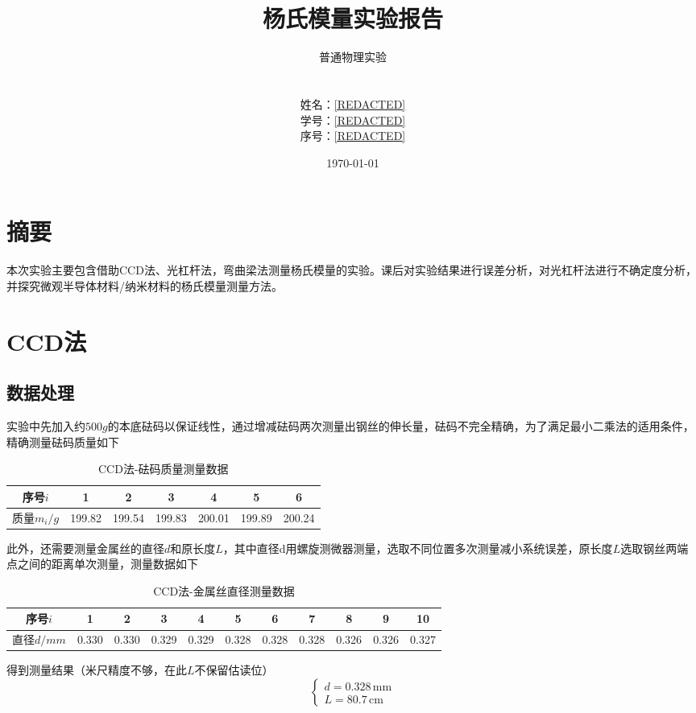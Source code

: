 \documentclass[12pt]{article}
\title{\Large\textbf{杨氏模量实验报告}}
\author{普通物理实验\\
        [REDACTED]\\
         \\
        姓名：\underline{\hspace{1cm}[REDACTED]\hspace{1cm}} \\
        学号：\underline{\hspace{0.5cm}[REDACTED]\hspace{0.5cm}} \\
        序号：\underline{\hspace{1.3cm}[REDACTED]\hspace{1.3cm}}}
\date{\today}
\begin{document}
\maketitle
\section{摘要}
\quad 本次实验主要包含借助CCD法、光杠杆法，弯曲梁法测量杨氏模量的实验。课后对实验结果进行误差分析，对光杠杆法进行不确定度分析，并探究微观半导体材料/纳米材料的杨氏模量测量方法。
\section{CCD法}
\subsection{数据处理}
\quad 实验中先加入约$500g$的本底砝码以保证线性，通过增减砝码两次测量出钢丝的伸长量，砝码不完全精确，为了满足最小二乘法的适用条件，精确测量砝码质量如下
\begin{table}[H]
    \centering
    \begin{tabular}{ccccccc}
    序号$i$   & 1      & 2      & 3      & 4      & 5      & 6      \\ \hline
    质量$m_i/g$ & 199.82 & 199.54 & 199.83 & 200.01 & 199.89 & 200.24
    \end{tabular}
    \caption{CCD法-砝码质量测量数据}
\end{table}
此外，还需要测量金属丝的直径$d$和原长度$L$，其中直径d用螺旋测微器测量，选取不同位置多次测量减小系统误差，原长度$L$选取钢丝两端点之间的距离单次测量，测量数据如下
\begin{table}[H]
    \centering
    \begin{tabular}{ccccccccccc}
    序号$i$   & 1      & 2      & 3      & 4      & 5      & 6     & 7     & 8     & 9     & 10    \\ \hline
    直径$d/mm$ & 0.330 & 0.330 & 0.329 & 0.329 & 0.328 & 0.328 & 0.328 & 0.326 & 0.326 & 0.327 \\
    \end{tabular}
    \caption{CCD法-金属丝直径测量数据}
\end{table}
得到测量结果（米尺精度不够，在此$L$不保留估读位）
\begin{equation*}
    \begin{cases}
        d = 0.328\,\text{mm} \\
        L = 80.7\,\text{cm}
    \end{cases}
\end{equation*}
\end{document}
